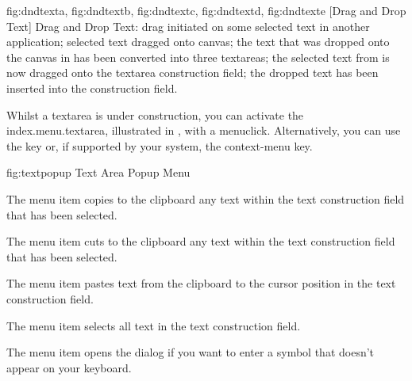{
 {fig:dndtexta}{}{},
 {fig:dndtextb}{}{},
 {fig:dndtextc}{}{},
 {fig:dndtextd}{}{},
 {fig:dndtexte}{}{}
}
[Drag and Drop Text]
{Drag and Drop Text:  drag initiated on some
selected text in another application; 
selected text dragged onto canvas;  the text
that was dropped onto the canvas in  has
been converted into three \glspl{textarea}; 
the selected text from  is now dragged onto
the \gls{textarea} construction field;  the
dropped text has been inserted into the construction field.}


Whilst a \gls{textarea} is under construction, you can activate the
\gls{index.menu.textarea}, illustrated in
, with a \gls{menuclick}. Alternatively,
you can use the  key or, if supported by your
system, the  \gls{context-menu} key.

\FloatFig
  {fig:textpopup}
  {}
  {Text Area Popup Menu}


The  menu item copies to the clipboard any text within 
the text construction field that has been selected.


The  menu item cuts to the clipboard any text within 
the text construction field that has been selected.


The  menu item pastes text from the
clipboard to the cursor position in the text construction field.


The  menu item selects all text in 
the text construction field.


The  menu item 
opens the  dialog  if you want to
enter a symbol that doesn't appear on your keyboard. 


